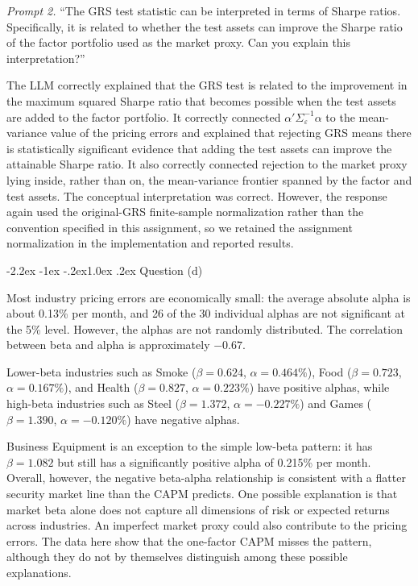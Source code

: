 \documentclass[11pt]{article}
\makeatletter
\renewcommand\subsection{\@startsection{subsection}{2}{0pt}%
  {-2.2ex \@plus -1ex \@minus -.2ex}{1.0ex \@plus .2ex}%
  {\normalfont\bfseries\normalsize\color{psink}}}
\makeatother
\begin{document}
\textit{Prompt 2.} ``The GRS test statistic can be interpreted in terms of
Sharpe ratios. Specifically, it is related to whether the test assets can
improve the Sharpe ratio of the factor portfolio used as the market proxy.
Can you explain this interpretation?''

The LLM correctly explained that the GRS test is related to the improvement
in the maximum squared Sharpe ratio that becomes possible when the test
assets are added to the factor portfolio. It correctly connected
$\alpha'\Sigma_{\varepsilon}^{-1}\alpha$ to the mean-variance value of the
pricing errors and explained that rejecting GRS means there is statistically
significant evidence that adding the test assets can improve the attainable
Sharpe ratio. It also correctly connected rejection to the market proxy
lying inside, rather than on, the mean-variance frontier spanned by the
factor and test assets. The conceptual interpretation was correct. However,
the response again used the original-GRS finite-sample normalization rather
than the convention specified in this assignment, so we retained the
assignment normalization in the implementation and reported results.

\subsection{Question (d)}

Most industry pricing errors are economically small: the average absolute
alpha is about 0.13\% per month, and 26 of the 30 individual alphas are not
significant at the 5\% level. However, the alphas are not randomly
distributed. The correlation between beta and alpha is approximately $-0.67$.

Lower-beta industries such as Smoke ($\beta=0.624$, $\alpha=0.464\%$), Food
($\beta=0.723$, $\alpha=0.167\%$), and Health ($\beta=0.827$,
$\alpha=0.223\%$) have positive alphas, while high-beta industries such as
Steel ($\beta=1.372$, $\alpha=-0.227\%$) and Games ($\beta=1.390$,
$\alpha=-0.120\%$) have negative alphas.

Business Equipment is an exception to the simple low-beta pattern: it has
$\beta=1.082$ but still has a significantly positive alpha of 0.215\% per
month. Overall, however, the negative beta-alpha relationship is consistent
with a flatter security market line than the CAPM predicts. One possible
explanation is that market beta alone does not capture all dimensions of
risk or expected returns across industries. An imperfect market proxy could
also contribute to the pricing errors. The data here show that the
one-factor CAPM misses the pattern, although they do not by themselves
distinguish among these possible explanations.
\end{document}
